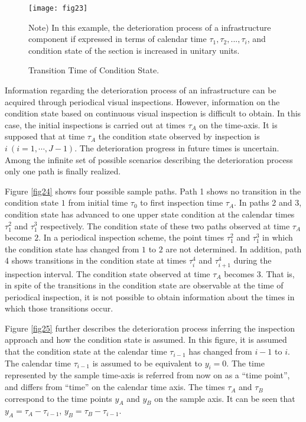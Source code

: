 \begin{figure}[t]
\begin{center}
\texttt{[image: fig23]} 
\end{center}
\footnotesize Note) In this example, the deterioration process of a infrastructure component if expressed in terms of calendar time $\tau_1, \tau_2,...,\tau_i$, and condition state of the section is increased in unitary units.
\caption{Transition Time of Condition State.}
\label{fig23} 
\end{figure}
%
Information regarding the deterioration process of an infrastructure can be acquired through periodical visual inspections. However, information on the condition state based on continuous visual inspection is difficult to obtain. In this case, the initial inspections is carried out at times $\tau_A$ on the time-axis. It is supposed that at time $\tau_A$ the condition state observed by inspection is $i~(i=1,\cdots,J-1)$. The deterioration progress in future times is uncertain. Among the infinite set of possible scenarios describing the deterioration process only one path is finally realized. 

Figure \ref{fig24} shows four possible sample paths. Path 1 shows no transition in the condition state $1$ from initial time $\tau_0$ to first inspection time $\tau_A$. In paths 2 and 3, condition state has advanced to one upper state condition at the calendar times $\tau_1^2$ and $\tau_1^3$ respectively. The condition state of these two paths observed at time $\tau_A$ become $2$. In a periodical inspection scheme, the point times $\tau_1^2$ and $\tau_1^3$ in which the condition state has changed from $1$ to $2$ are not determined. In addition, path 4 shows transitions in the condition state at times $\tau_i^4$ and $\tau_{i+1}^4$ during the inspection interval. The condition state observed at time $\tau_A$ becomes $3$. That is, in spite of the transitions in the condition state are observable at the time of periodical inspection, it is not possible to obtain information about the times in which those transitions occur.

Figure \ref{fig25} further describes the deterioration process inferring the inspection approach and how the condition state is assumed. In this figure, it is assumed that the condition state at the calendar time $\tau_{i-1}$ has changed from $i-1$ to $i$. The calendar time $\tau_{i-1}$ is assumed to be equivalent to $y_i=0$. The time represented by the sample time-axis is referred from now on as a ``time point'', and differs from ``time'' on the calendar time axis. The times $\tau_A$ and $\tau_B$ correspond to the time points $y_A$ and $y_B$ on the sample axis. It can be seen that $y_A=\tau_A-\tau_{i-1}$, $y_B=\tau_B-\tau_{i-1}$. 

